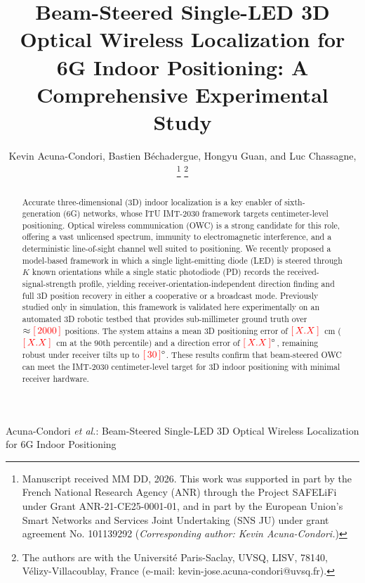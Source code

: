 \documentclass[journal]{IEEEtran}
\newcommand{\ph}[1]{\textcolor{red}{[\,#1\,]}}
\begin{document}

\title{Beam-Steered Single-LED 3D Optical Wireless Localization for 6G Indoor Positioning: A Comprehensive Experimental Study}
\author{
    Kevin Acuna-Condori,
    Bastien B\'{e}chadergue, 
    Hongyu Guan, and
    Luc Chassagne, 
    \thanks{Manuscript received MM DD, 2026.
    This work was supported in part by the French National Research Agency (ANR) through the Project SAFELiFi under Grant ANR-21-CE25-0001-01, and in part by the European Union's Smart Networks and Services Joint Undertaking (SNS JU) under grant agreement No. 101139292 (\textit{Corresponding author: Kevin Acuna-Condori.})
    }
    \thanks{The authors are with the Université Paris-Saclay, UVSQ, LISV, 78140, Vélizy-Villacoublay, France (e-mail: kevin-jose.acuna-condori@uvsq.fr).}
}
%
{Acuna-Condori \MakeLowercase{\textit{et al.}}: Beam-Steered Single-LED 3D Optical Wireless Localization for 6G Indoor Positioning}
\maketitle

\begin{abstract}
Accurate three-dimensional (3D) indoor localization is a key enabler of sixth-generation (6G) networks, whose ITU IMT-2030 framework targets centimeter-level positioning. Optical wireless communication (OWC) is a strong candidate for this role, offering a vast unlicensed spectrum, immunity to electromagnetic interference, and a deterministic line-of-sight channel well suited to positioning. We recently proposed a model-based framework in which a single light-emitting diode (LED) is steered through $K$ known orientations while a single static photodiode (PD) records the received-signal-strength profile, yielding receiver-orientation-independent direction finding and full 3D position recovery in either a cooperative or a broadcast mode. Previously studied only in simulation, this framework is validated here experimentally on an automated 3D robotic testbed that provides sub-millimeter ground truth over $\approx\ph{2000}$ positions. The system attains a mean 3D positioning error of $\ph{X.X}$~cm ($\ph{X.X}$~cm at the $90$th percentile) and a direction error of $\ph{X.X}^\circ$, remaining robust under receiver tilts up to $\ph{30}^\circ$. These results confirm that beam-steered OWC can meet the IMT-2030 centimeter-level target for 3D indoor positioning with minimal receiver hardware.
\end{abstract}
\end{document}
